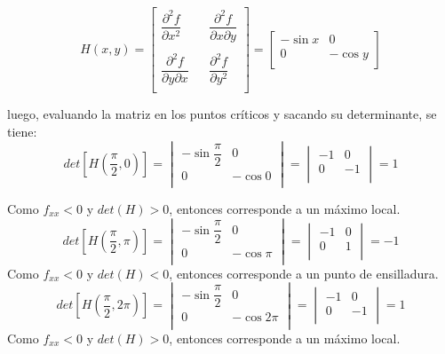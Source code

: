 \documentclass[a4paper,12pt]{article}
\begin{document}
			$$H(x,y) = \begin{bmatrix}
    					\dfrac{\partial^2f}{\partial x^2} & & \dfrac{\partial^2f}{\partial x\partial y} \\
    					& & \\
    					\dfrac{\partial^2f}{\partial y\partial x}&  & \dfrac{\partial^2f}{\partial y^2} \\
						\end{bmatrix} =
						\begin{bmatrix}
			    			-\sin x & 0 \\
			    			0  & - \cos y \\
						\end{bmatrix}
						$$

		luego, evaluando la matriz en los puntos críticos y sacando su determinante,
		se tiene:
		$$det[H(\frac{\pi}{2}, 0)] =
			\begin{vmatrix}
				-\sin \dfrac{\pi}{2} & 0 \\
				0  & - \cos 0 \\
			\end{vmatrix} =
			\begin{vmatrix}
				-1 & 0 \\
				 0 & -1 \\
			\end{vmatrix} = 1$$

		Como $f_{xx} < 0$ y $det(H) > 0$, entonces corresponde a un máximo local.\\
		$$det[H(\frac{\pi}{2}, \pi)] =
			\begin{vmatrix}
				-\sin \dfrac{\pi}{2} & 0 \\
				0  & - \cos \pi \\
			\end{vmatrix} =
			\begin{vmatrix}
				-1 & 0 \\
				 0 & 1 \\
			\end{vmatrix} = -1$$
		Como $f_{xx} < 0$ y $det(H) < 0$, entonces corresponde a un punto de ensilladura.\\
		$$det[H(\frac{\pi}{2}, 2\pi)] =
			\begin{vmatrix}
				-\sin \dfrac{\pi}{2} & 0 \\
				0  & - \cos 2\pi \\
			\end{vmatrix} =
			\begin{vmatrix}
				-1 & 0 \\
				 0 & -1 \\
			\end{vmatrix} = 1$$
		Como $f_{xx} < 0$ y $det(H) > 0$, entonces corresponde a un máximo local.\\
		\newpage
\end{document}
